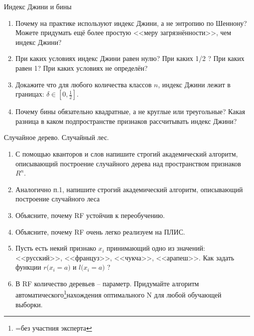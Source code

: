 \documentclass{beamer}
\begin{document}
\begin{frame}{Индекс Джини и бины}
	\begin{enumerate}
		\item Почему на практике используют индекс Джини, а не энтропию по Шеннону? 
		Можете придумать ещё более простую <<меру загрязнённости>>, чем индекс Джини?
		\item При каких условиях индекс Джини равен нулю? При каких 1/2 ? 
		При каких равен 1? При каких условиях не определён?
		\item Докажите что для любого количества классов $n$, индекс Джини лежит в границах: $\delta \in [0, \frac{1}{2}]$.
		\item Почему бины обязательно квадратные, а не круглые или треугольные? Какая разница
		в каком подпространстве признаков рассчитывать индекс Джини? 	
	\end{enumerate}
\end{frame}



\begin{frame}{Случайное дерево. Случайный лес.}
	\begin{enumerate}
	\item С помощью кванторов и слов 
	напишите строгий академический алгоритм,
	описывающий построение случайного дерева 
	над пространством признаков $R^n$.
	\item Аналогично п.1, напишите 
	строгий академический алгоритм,
	описывающий построение случайного леса
	\item Объясните, почему RF устойчив к переобучению.
	\item Объясните, почему RF очень легко реализуем на ПЛИС.
	\item Пусть есть некий признако $x_i$ принимающий одно из значений: 
	<<русский>>, <<француз>>, <<чукча>>, <<арапеш>>. Как задать функции
	$r\big(x_i=a\big)$ и $l\big(x_i=a\big)$ ? 
	\item В RF количество деревьев -- параметр. 
	Придумайте алгоритм автоматического\footnote{=без участния эксперта}нахождения оптимального N
	для любой обучающей выборки.
	\end{enumerate} 
\end{frame} 
\end{document}
